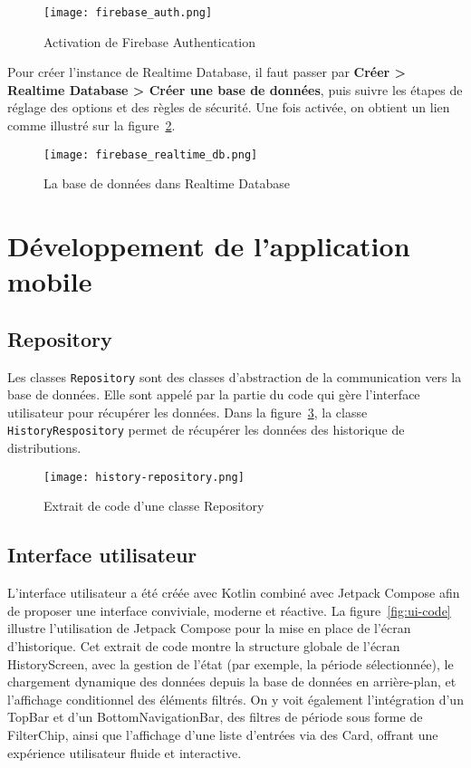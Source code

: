\begin{figure}[H]
   \centering
   \texttt{[image: firebase\_auth.png]}
   \caption{Activation de Firebase Authentication}
   \label{fig:activation_de_Firebase_Auth}
\end{figure}

Pour créer l'instance de Realtime Database, il faut passer par \textbf{Créer > Realtime Database > Créer une base de données}, puis suivre les étapes de réglage des options et des règles de sécurité. Une fois activée, on obtient un lien comme illustré sur la figure~\ref{fig:db_dans_realtime_db}. 

\begin{figure}[H]
   \centering
   \texttt{[image: firebase\_realtime\_db.png]}
   \caption{La base de données dans Realtime Database}
   \label{fig:db_dans_realtime_db}
\end{figure}


\section{Développement de l'application mobile}
	\subsection{Repository}
		Les classes \verb|Repository| sont des classes d'abstraction de la communication vers la base de données. Elle sont appelé par la partie du code qui gère l'interface utilisateur pour récupérer les données. 	Dans la figure~\ref{fig:history-repository}, la classe \verb|HistoryRespository| permet de récupérer les données des historique de distributions. 
	\begin{figure}[H]
   			\centering
   			\texttt{[image: history-repository.png]}
   			\caption{Extrait de code d'une classe Repository}
   			\label{fig:history-repository}
	\end{figure}
	
\subsection{Interface utilisateur}
	L’interface utilisateur a été créée avec Kotlin combiné avec Jetpack Compose afin de proposer une interface conviviale, moderne et réactive.
La figure~\ref{fig:ui-code} illustre l’utilisation de Jetpack Compose pour la mise en place de l’écran d’historique. Cet extrait de code montre la structure globale de l’écran HistoryScreen, avec la gestion de l’état (par exemple, la période sélectionnée), le chargement dynamique des données depuis la base de données en arrière-plan, et l’affichage conditionnel des éléments filtrés.
On y voit également l’intégration d’un TopBar et d’un BottomNavigationBar, des filtres de période sous forme de FilterChip, ainsi que l’affichage d’une liste d’entrées via des Card, offrant une expérience utilisateur fluide et interactive.
	
